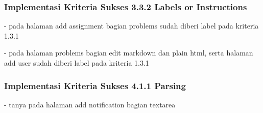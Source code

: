 \subsubsection{Implementasi Kriteria Sukses 3.3.2 Labels or Instructions}
\label{subsubsec:implementasi_A_3.3.2}

- pada halaman add assignment bagian problems sudah diberi label pada kriteria 1.3.1

- pada halaman problems bagian edit markdown dan plain html, serta halaman add user sudah diberi label pada kriteria 1.3.1

\subsubsection{Implementasi Kriteria Sukses 4.1.1 Parsing}
\label{subsubsec:implementasi_A_4.1.1}

- tanya pada halaman add notification bagian textarea